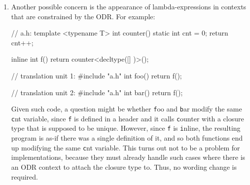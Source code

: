 \documentclass{wg21}
\newcommand{\cc}[1]{\texttt{#1}}
\begin{document}
\begin{enumerate}
    Thus, a function template declaration such as the following will require the
    implementation to make the lambda-expression part of the signature, which is
    specifically what we would like to avoid:
\begin{cpp}
template <int N>
void f(const char (*s)[([]{}, N)]) { }
\end{cpp}

    The other situation we would like to avoid is for implementations to have
    to figure out that the two following expressions are equivalent, either
    for linkage purposes (in different translation units) or for redeclaration
    purposes (in the same translation unit):
\begin{cpp}
template <int N> void f(const char (*s)[([]{ return N; })()]) { }
template <int N> void f(const char (*s)[([]{ return N; })()]) { }
\end{cpp}

    This case is slightly different from the first one, since the template
    parameter appears in the body of the lambda-expression, which is not
    considered part of the full-expression in the function parameter list.
    To make sure these cases do not happen, we propose
    \hyperref[wording.template]{amending \textbf{[temp.over.link]}}.


  \item \label{discussion.ODR}
    Another possible concern is the appearance of lambda-expressions in
    contexts that are constrained by the ODR. For example:

\begin{cpp}
// a.h:
template <typename T>
int counter() {
  static int cnt = 0;
  return cnt++;
}

inline int f() {
  return counter<decltype([] {})>();
}

// translation unit 1:
#include "a.h"
int foo() { return f(); }

// translation unit 2:
#include "a.h"
int bar() { return f(); }
\end{cpp}

    Given such code, a question might be whether \cc foo and \cc bar modify
    the same \cc cnt variable, since \cc f is defined in a header and it calls
    \cc counter with a closure type that is supposed to be unique. However,
    since \cc f is \cc inline, the resulting program is as-if there was a
    single definition of it, and so both functions end up modifying the same
    \cc cnt variable. This turns out not to be a problem for implementations,
    because they must already handle such cases where there is an ODR context
    to attach the closure type to. Thus, no wording change is required.



\end{enumerate}
\end{document}
